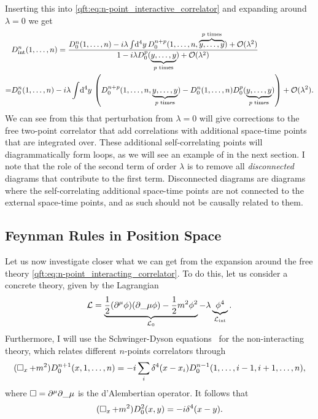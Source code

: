 \documentclass[../main.tex]{subfiles}
\begin{document}
Inserting this into \cref{qft:eq:n-point_interactive_correlator} and expanding around \(\lambda = 0\) we get
\begin{align}
  \label{qft:eq:n-point_interacting_correlator}
  \nonumber
    & D^n_\text{int}(1,\ldots, n) = \frac{D_0^n(1, \ldots, n) - i\lambda \int \!\mathrm{d}^4y\, D_0^{n+p}(1, \ldots, n, \overbrace{y, \ldots, y}^{p\text{ times}}) + \mathcal{O}(\lambda^2)}{1 - i\lambda D_0^p(\underbrace{y, \ldots, y}_{p\text{ times}}) + \mathcal{O}(\lambda^2)} \\
  = & D^n_0(1,\ldots,n) - i\lambda \int \!\mathrm{d}^4y\, \left(D_0^{n+p}(1, \ldots, n, \underbrace{y, \ldots, y}_{p\text{ times}}) - D_0^n(1, \ldots, n) D_0^p(\underbrace{y, \ldots, y}_{p\text{ times}})\right) + \mathcal{O}(\lambda^2).
\end{align}
We can see from this that perturbation from \(\lambda = 0\) will give corrections to the free two-point correlator that add correlations with additional space-time points that are integrated over.
These additional self-correlating points will diagrammatically form loops, as we will see an example of in the next section.
I note that the role of the second term of order \(\lambda\) is to remove all \emph{disconnected} diagrams that contribute to the first term.
Disconnected diagrams are diagrams where the self-correlating additional space-time points are not connected to the external space-time points, and as such should not be causally related to them.


\subsection{Feynman Rules in Position Space}
Let us now investigate closer what we can get from the expansion around the free theory \cref{qft:eq:n-point_interacting_correlator}.
To do this, let us consider a concrete theory, given by the Lagrangian
\begin{equation}
  \label{qft:eq:phi4}
  \L = \underbrace{\frac{1}{2}(\partial\^\mu \phi)(\partial\_\mu\phi) - \frac{1}{2}m^2 \phi^2}_{\L_0} - \lambda \underbrace{\phi^4}_{\L_\text{int}}.
\end{equation}
Furthermore, I will use the Schwinger-Dyson equations~\cite{Schwartz:2014sze} for the non-interacting theory, which relates different \(n\)-points correlators through
\begin{equation}
  \label{qft:eq:Schwinger-Dyson_n-point}
  (\operatorname{\Box}_x + m^2) D_0^{n+1}(x, 1, \ldots, n) = -i\sum_{i} \delta^4(x-x_i) D_0^{n-1}(1, \ldots, i-1, i+1, \ldots, n),
\end{equation}
where \(\dA = \partial\^\mu \partial\_\mu\) is the d'Alembertian operator.
It follows that
\begin{equation}
  \label{qft:eq:Schwinger-Dyson_2-point}
  (\operatorname{\Box}_x + m^2) D^2_0(x,y) = -i \delta^4(x-y).
\end{equation}
\end{document}
